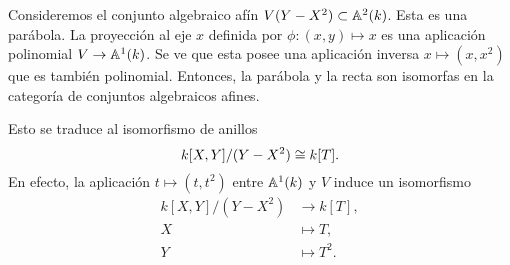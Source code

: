 \documentclass{article}
\numberwithin{equation}{section}
\theoremstyle{definition}
\begin{document}
\begin{ejemplo}
  Consideremos el conjunto algebraico afín $V (Y - X^2) \subset \AA^2 (k)$.
  Esta es una parábola. La proyección al eje $x$ definida por
  $\phi\colon (x,y)\mapsto x$ es una aplicación polinomial $V\to \AA^1 (k)$.
  Se ve que esta posee una aplicación inversa $x\mapsto (x,x^2)$ que es también
  polinomial. Entonces, la parábola y la recta son isomorfas en la categoría de
  conjuntos algebraicos afines.

  \begin{center}
  \end{center}

  Esto se traduce al isomorfismo de anillos
  $$k [X,Y] / (Y- X^2) \isom k [T].$$
  En efecto, la aplicación $t \mapsto (t,t^2)$ entre $\AA^1 (k)$ y $V$ induce un
  isomorfismo
  \begin{align*}
    k [X,Y] / (Y- X^2) & \to k [T],\\
    X & \mapsto T,\\
    Y & \mapsto T^2.
  \end{align*}
\end{ejemplo}
\end{document}
